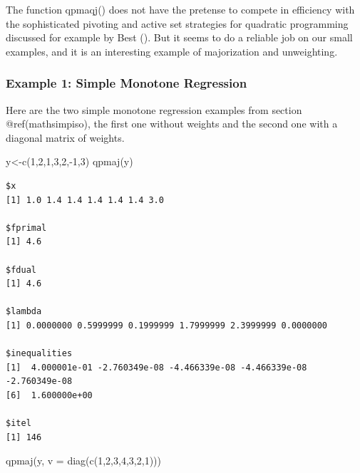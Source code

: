 \documentclass[
  12pt,
  letterpaper,
  DIV=11,
  numbers=noendperiod]{scrreprt}
\newenvironment{Shaded}{\begin{snugshade}}{\end{snugshade}}
\newcommand{\AttributeTok}[1]{\textcolor[rgb]{0.40,0.45,0.13}{#1}}
\newcommand{\DecValTok}[1]{\textcolor[rgb]{0.68,0.00,0.00}{#1}}
\newcommand{\FunctionTok}[1]{\textcolor[rgb]{0.28,0.35,0.67}{#1}}
\newcommand{\NormalTok}[1]{\textcolor[rgb]{0.00,0.23,0.31}{#1}}
\newcommand{\OtherTok}[1]{\textcolor[rgb]{0.00,0.23,0.31}{#1}}
\newcommand{\SpecialCharTok}[1]{\textcolor[rgb]{0.37,0.37,0.37}{#1}}
\theoremstyle{remark}
\begin{document}
The function qpmaqj() does not have the pretense to compete in
efficiency with the sophisticated pivoting and active set strategies for
quadratic programming discussed for example by Best
(). But it seems to do a reliable job on our
small examples, and it is an interesting example of majorization and
unweighting.

\subsubsection{Example 1: Simple Monotone
Regression}\label{example-1-simple-monotone-regression}

Here are the two simple monotone regression examples from section
@ref(mathsimpiso), the first one without weights and the second one with
a diagonal matrix of weights.

\begin{Shaded}
\begin{Highlighting}[]
\NormalTok{y}\OtherTok{\textless{}{-}}\FunctionTok{c}\NormalTok{(}\DecValTok{1}\NormalTok{,}\DecValTok{2}\NormalTok{,}\DecValTok{1}\NormalTok{,}\DecValTok{3}\NormalTok{,}\DecValTok{2}\NormalTok{,}\SpecialCharTok{{-}}\DecValTok{1}\NormalTok{,}\DecValTok{3}\NormalTok{)}
\FunctionTok{qpmaj}\NormalTok{(y)}
\end{Highlighting}
\end{Shaded}

\begin{verbatim}
$x
[1] 1.0 1.4 1.4 1.4 1.4 1.4 3.0

$fprimal
[1] 4.6

$fdual
[1] 4.6

$lambda
[1] 0.0000000 0.5999999 0.1999999 1.7999999 2.3999999 0.0000000

$inequalities
[1]  4.000001e-01 -2.760349e-08 -4.466339e-08 -4.466339e-08 -2.760349e-08
[6]  1.600000e+00

$itel
[1] 146
\end{verbatim}

\begin{Shaded}
\begin{Highlighting}[]
\FunctionTok{qpmaj}\NormalTok{(y, }\AttributeTok{v =} \FunctionTok{diag}\NormalTok{(}\FunctionTok{c}\NormalTok{(}\DecValTok{1}\NormalTok{,}\DecValTok{2}\NormalTok{,}\DecValTok{3}\NormalTok{,}\DecValTok{4}\NormalTok{,}\DecValTok{3}\NormalTok{,}\DecValTok{2}\NormalTok{,}\DecValTok{1}\NormalTok{)))}
\end{Highlighting}
\end{Shaded}
\end{document}
